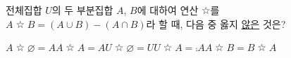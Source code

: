전체집합 $U$의 두 부분집합 $A$, $B$에 대하여 연산 $\mathbin{\text{☆}}$를 $A\mathbin{\text{☆}}B=(A\cup B)-(A\cap B)$라 할 때, 다음 중 옳지 \underline{않은} 것은?
\begin{choicesii}{$A\mathbin{\text{☆}}\varnothing=A$}{$A\mathbin{\text{☆}}A=A$}{$U\mathbin{\text{☆}}\varnothing=U$}{$U\mathbin{\text{☆}}A=\comp{A}$}{$A\mathbin{\text{☆}}B=B\mathbin{\text{☆}}A$}\end{choicesii}
